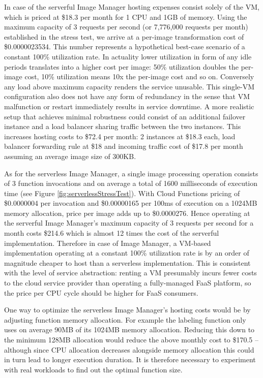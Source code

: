 In case of the serverful Image Manager hosting expenses consist solely of the VM, which is priced at \$18.3 per month for 1 CPU and 1GB of memory. Using the maximum capacity of 3 requests per second (or 7,776,000 requests per month) established in the stress test, we arrive at a per-image transformation cost of \$0.0000023534. This number represents a hypothetical best-case scenario of a constant 100\% utilization rate. In actuality lower utilization in form of any idle periods translates into a higher cost per image: 50\% utilization doubles the per-image cost, 10\% utilization means 10x the per-image cost and so on. Conversely any load above maximum capacity renders the service unusable. This single-VM configuration also does not have any form of redundancy in the sense that VM malfunction or restart immediately results in service downtime. A more realistic setup that achieves minimal robustness could consist of an additional failover instance and a load balancer sharing traffic between the two instances. This increases hosting costs to \$72.4 per month: 2 instances at \$18.3 each, load balancer forwarding rule at \$18 and incoming traffic cost of \$17.8 per month assuming an average image size of 300KB. \parencite{google18cloudFunctions}

As for the serverless Image Manager, a single image processing operation consists of 3 function invocations and on average a total of 1600 milliseconds of execution time (see Figure \ref{fig:serverlessStressTest}). With Cloud Functions pricing of \$0.0000004 per invocation and \$0.00000165 per 100ms of execution on a 1024MB memory allocation, price per image adds up to \$0.0000276. Hence operating at the serverful Image Manager's maximum capacity of 3 requests per second for a month costs \$214.6 which is almost 12 times the cost of the serverful implementation. Therefore in case of Image Manager, a VM-based implementation operating at a constant 100\% utilization rate is by an order of magnitude cheaper to host than a serverless implementation. This is consistent with the level of service abstraction: renting a VM presumably incurs fewer costs to the cloud service provider than operating a fully-managed FaaS platform, so the price per CPU cycle should be higher for FaaS consumers. \parencite{google18cloudFunctions}

One way to optimize the serverless Image Manager's hosting costs would be by adjusting function memory allocation. For example the labeling function only uses on average 90MB of its 1024MB memory allocation. Reducing this down to the minimum 128MB allocation would reduce the above monthly cost to \$170.5 -- although since CPU allocation decreases alongside memory allocation this could in turn lead to longer execution duration. It is therefore necessary to experiment with real workloads to find out the optimal function size.

